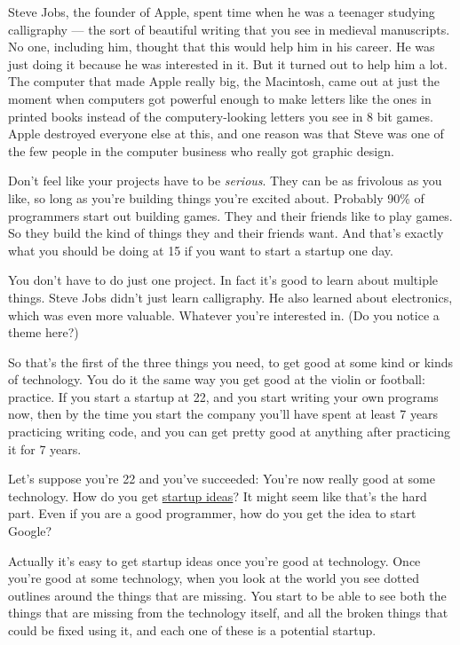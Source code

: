 Steve Jobs, the founder of Apple, spent time when he was a teenager
studying calligraphy --- the sort of beautiful writing that you see in
medieval manuscripts. No one, including him, thought that this would
help him in his career. He was just doing it because he was interested
in it. But it turned out to help him a lot. The computer that made Apple
really big, the Macintosh, came out at just the moment when computers
got powerful enough to make letters like the ones in printed books
instead of the computery-looking letters you see in 8 bit games. Apple
destroyed everyone else at this, and one reason was that Steve was one
of the few people in the computer business who really got graphic
design.

Don't feel like your projects have to be \emph{serious}. They can be as
frivolous as you like, so long as you're building things you're excited
about. Probably 90\% of programmers start out building games. They and
their friends like to play games. So they build the kind of things they
and their friends want. And that's exactly what you should be doing at
15 if you want to start a startup one day.

You don't have to do just one project. In fact it's good to learn about
multiple things. Steve Jobs didn't just learn calligraphy. He also
learned about electronics, which was even more valuable. Whatever you're
interested in. (Do you notice a theme here?)

So that's the first of the three things you need, to get good at some
kind or kinds of technology. You do it the same way you get good at the
violin or football: practice. If you start a startup at 22, and you
start writing your own programs now, then by the time you start the
company you'll have spent at least 7 years practicing writing code, and
you can get pretty good at anything after practicing it for 7 years.

Let's suppose you're 22 and you've succeeded: You're now really good at
some technology. How do you get \href{startupideas.html}{startup ideas}?
It might seem like that's the hard part. Even if you are a good
programmer, how do you get the idea to start Google?

Actually it's easy to get startup ideas once you're good at technology.
Once you're good at some technology, when you look at the world you see
dotted outlines around the things that are missing. You start to be able
to see both the things that are missing from the technology itself, and
all the broken things that could be fixed using it, and each one of
these is a potential startup.

